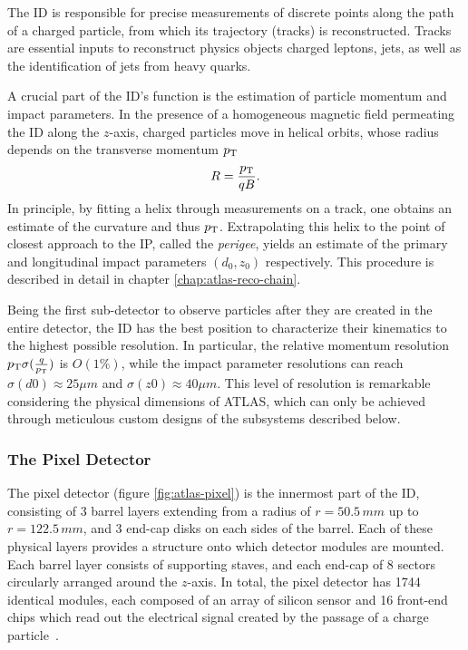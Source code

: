 The ID is responsible for precise measurements of discrete points along the path of a charged particle, from which its trajectory (tracks) is reconstructed. 
Tracks are essential inputs to reconstruct physics objects charged leptons, jets, as well as the identification of jets from heavy quarks. 

A crucial part of the ID's function is the estimation of particle momentum and impact parameters. 
In the presence of a homogeneous magnetic field permeating the ID along the $z$-axis, charged particles move in helical orbits, whose radius depends on the transverse momentum $p_{\text{T}}$
\begin{equation}
    \label{eq:3.3}
    R = \frac{p_{\text{T}}}{qB}.
\end{equation}
In principle, by fitting a helix through measurements on a track, one obtains an estimate of the curvature and thus $p_{\text{T}}$. 
Extrapolating this helix to the point of closest approach to the IP, called the \textit{perigee}, yields an estimate of the primary and longitudinal impact parameters $(d_0, z_0)$ respectively. 
This procedure is described in detail in chapter \ref{chap:atlas-reco-chain}. 

Being the first sub-detector to observe particles after they are created in the entire detector, the ID has the best position to characterize their kinematics to the highest possible resolution. 
In particular, the relative momentum resolution $p_{\text{T}}\sigma(\frac{q}{p_{\text{T}}})$ is $O(1\%)$, while the impact parameter resolutions can reach $\sigma(d0)\approx 25\mu m$ and $\sigma(z0)\approx 40\mu m$.
This level of resolution is remarkable considering the physical dimensions of ATLAS, which can only be achieved through meticulous custom designs of the subsystems described below.

\subsubsection{The Pixel Detector}
The pixel detector \cite{ATLAS-TDR-11} (figure \ref{fig:atlas-pixel}) is the innermost part of the ID, consisting of 3 barrel layers extending from a radius of $r=50.5\, mm$ up to $r=122.5\, mm$, and 3 end-cap disks on each sides of the barrel. 
Each of these physical layers provides a structure onto which detector modules are mounted. 
Each barrel layer consists of supporting staves, and each end-cap of 8 sectors circularly arranged around the $z$-axis. 
In total, the pixel detector has 1744 identical modules, each composed of an array of silicon sensor and 16 front-end chips which read out the electrical signal created by the passage of a charge particle~\cite{front-end-chips}.

